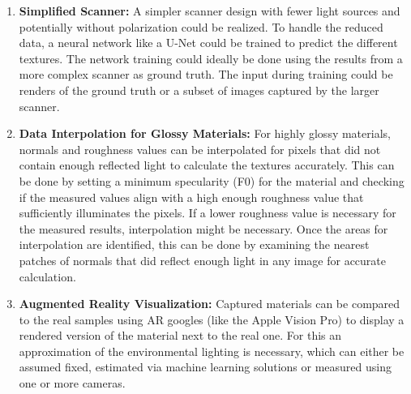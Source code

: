 \documentclass[11pt, twoside, listof=totocnumbered, bibliography=totocnumbered]{scrartcl}
\begin{document}
\begin{enumerate}
	\item \textbf{Simplified Scanner:} A simpler scanner design with fewer light sources and potentially without polarization could be realized. To handle the reduced data, a neural network like a U-Net could be trained to predict the different textures. The network training could ideally be done using the results from a more complex scanner as ground truth. The input during training could be renders of the ground truth or a subset of images captured by the larger scanner.
	\item \textbf{Data Interpolation for Glossy Materials:} For highly glossy materials, normals and roughness values can be interpolated for pixels that did not contain enough reflected light to calculate the textures accurately. This can be done by setting a minimum specularity (F0) for the material and checking if the measured values align with a high enough roughness value that sufficiently illuminates the pixels. If a lower roughness value is necessary for the measured results, interpolation might be necessary. Once the areas for interpolation are identified, this can be done by examining the nearest patches of normals that did reflect enough light in any image for accurate calculation.
	\item \textbf{Augmented Reality Visualization:} Captured materials can be compared to the real samples using AR googles (like the Apple Vision Pro) to display a rendered version of the material next to the real one. For this an approximation of the environmental lighting is necessary, which can either be assumed fixed, estimated via machine learning solutions or measured using one or more cameras.

\end{enumerate}
\end{document}
